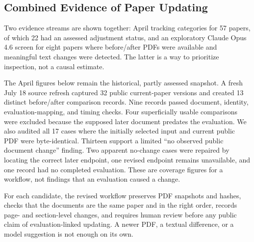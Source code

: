 \documentclass[
  11pt,
  letterpaper,
]{article}
\begin{document}
\subsection{Combined Evidence of Paper
Updating}\label{combined-evidence}

Two evidence streams are shown together: April tracking categories for
57 papers, of which 22 had an assessed adjustment status, and an
exploratory Claude Opus 4.6 screen for eight papers where before/after
PDFs were available and meaningful text changes were detected. The
latter is a way to prioritize inspection, not a causal estimate.

\begin{tcolorbox}[enhanced jigsaw, colframe=quarto-callout-important-color-frame, breakable, rightrule=.15mm, toptitle=1mm, opacitybacktitle=0.6, opacityback=0, colback=white, bottomtitle=1mm, leftrule=.75mm, toprule=.15mm, coltitle=black, bottomrule=.15mm, titlerule=0mm, title=\textcolor{quarto-callout-important-color}{\faExclamation}\hspace{0.5em}{Current validation work (July 2026)}, colbacktitle=quarto-callout-important-color!10!white, arc=.35mm, left=2mm]

The April figures below remain the historical, partly assessed snapshot.
A fresh July 18 source refresh captured 32 public current-paper versions
and created 13 distinct before/after comparison records. Nine records
passed document, identity, evaluation-mapping, and timing checks. Four
superficially usable comparisons were excluded because the supposed
later document predates the evaluation. We also audited all 17 cases
where the initially selected input and current public PDF were
byte-identical. Thirteen support a limited ``no observed public document
change'' finding. Two apparent no-change cases were repaired by locating
the correct later endpoint, one revised endpoint remains unavailable,
and one record had no completed evaluation. These are coverage figures
for a workflow, not findings that an evaluation caused a change.

For each candidate, the revised workflow preserves PDF snapshots and
hashes, checks that the documents are the same paper and in the right
order, records page- and section-level changes, and requires human
review before any public claim of evaluation-linked updating. A newer
PDF, a textual difference, or a model suggestion is not enough on its
own.

\end{tcolorbox}
\end{document}
